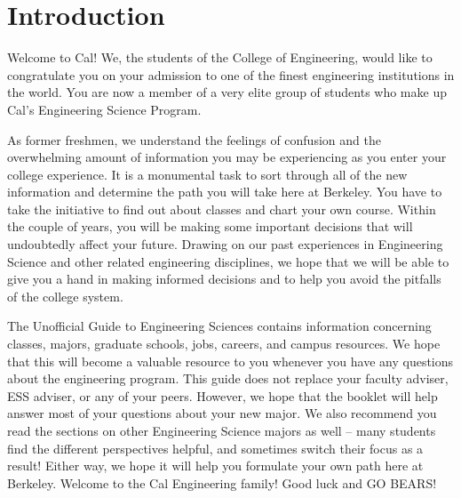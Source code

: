 \chapter*{Introduction}

Welcome to Cal! We, the students of the College of Engineering, would like to congratulate you on your admission to one of the finest engineering institutions in the world. You are now a member of a very elite group of students who make up Cal's Engineering Science Program.

As former freshmen, we understand the feelings of confusion and the overwhelming amount of information you may be experiencing as you enter your college experience. It is a monumental task to sort through all of the new information and determine the path you will take here at Berkeley. You have to take the initiative to find out about classes and chart your own course. Within the couple of years, you will be making some important decisions that will undoubtedly affect your future. Drawing on our past experiences in Engineering Science and other related engineering disciplines, we hope that we will be able to give you a hand in making informed decisions and to help you avoid the pitfalls of the college system.

The Unofficial Guide to Engineering Sciences contains information concerning classes, majors, graduate schools, jobs, careers, and campus resources. We hope that this will become a valuable resource to you whenever you have any questions about the engineering program. This guide does not replace your faculty adviser, ESS adviser, or any of your peers. However, we hope that the booklet will help answer most of your questions about your new major. We also recommend you read the sections on other Engineering Science majors as well -- many students find the different perspectives helpful, and sometimes switch their focus as a result! Either way, we hope it will help you formulate your own path here at Berkeley. Welcome to the Cal Engineering family! Good luck and GO BEARS!

